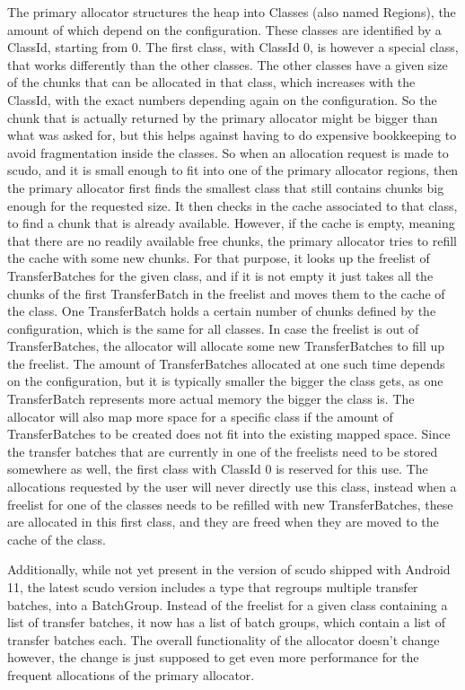 \documentclass[a4paper,11pt,oneside]{report}
\begin{document}
The primary allocator structures the heap into Classes (also named Regions), the
amount of which depend on the configuration. These classes are identified by a
ClassId, starting from 0. The first class, with ClassId 0, is however a special
class, that works differently than the other classes. The other classes have a
given size of the chunks that can be allocated in that class, which increases
with the ClassId, with the exact numbers depending again on the configuration.
So the chunk that is actually returned by the primary allocator might be bigger
than what was asked for, but this helps against having to do expensive bookkeeping
to avoid fragmentation inside the classes.
So when an allocation request is made to scudo, and it is small enough to fit into
one of the primary allocator regions, then the primary allocator first finds the
smallest class that still contains chunks big enough for the requested size. It
then checks in the cache associated to that class, to find a chunk that is already
available. However, if the cache is empty, meaning that there are no readily
available free chunks, the primary allocator tries to refill the cache with some
new chunks. For that purpose, it looks up the freelist of TransferBatches for the
given class, and if it is not empty it just takes all the chunks of the first
TransferBatch in the freelist and moves them to the cache of the class. One
TransferBatch holds a certain number of chunks defined by the configuration,
which is the same for all classes.
In case the freelist is out of TransferBatches, the allocator will allocate
some new TransferBatches to fill up the freelist. The amount of TransferBatches
allocated at one such time depends on the configuration, but it is typically
smaller the bigger the class gets, as one TransferBatch represents more actual
memory the bigger the class is. The allocator will also map more space for a
specific class if the amount of TransferBatches to be created does not fit into
the existing mapped space.
Since the transfer batches that are currently in one of the freelists need to
be stored somewhere as well, the first class with ClassId 0 is reserved for
this use. The allocations requested by the user will never directly use this
class, instead when a freelist for one of the classes needs to be refilled
with new TransferBatches, these are allocated in this first class, and they
are freed when they are moved to the cache of the class.

Additionally, while not yet present in the version of scudo shipped with Android
11, the latest scudo version includes a type that regroups multiple transfer
batches, into a BatchGroup. Instead of the freelist for a given class containing
a list of transfer batches, it now has a list of batch groups, which contain
a list of transfer batches each. The overall functionality of the allocator
doesn't change however, the change is just supposed to get even more performance
for the frequent allocations of the primary allocator.
\end{document}
